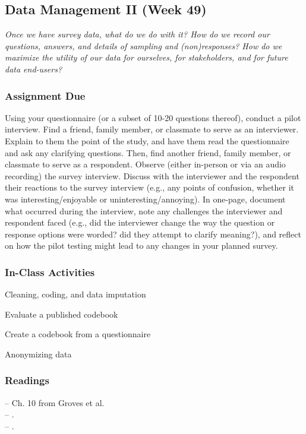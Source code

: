 \documentclass[11pt,a4paper]{article}
\newcommand{\reading}[2][]{\noindent -- {#1}\bibentry{#2}.\vspace{.25em}\\}
\newcommand{\textbook}[2][]{\noindent -- {#1} from Groves et al.\vspace{.25em}\\} %
\newcommand{\seealso}{\noindent \emph{See Also:}\\}
\begin{document}
\clearpage
\subsection{Data Management II (Week 49)}
\emph{Once we have survey data, what do we do with it? How do we record our questions, answers, and details of sampling and (non)responses? How do we maximize the utility of our data for ourselves, for stakeholders, and for future data end-users?}

\vspace{1em}
\subsubsection*{Assignment Due}
Using your questionnaire (or a subset of 10-20 questions thereof), conduct a pilot interview. Find a friend, family member, or classmate to serve as an interviewer. Explain to them the point of the study, and have them read the questionnaire and ask any clarifying questions. Then, find another friend, family member, or classmate to serve as a respondent. Observe (either in-person or via an audio recording) the survey interview. Discuss with the interviewer and the respondent their reactions to the survey interview (e.g., any points of confusion, whether it was interesting/enjoyable or uninteresting/annoying). In one-page, document what occurred during the interview, note any challenges the interviewer and respondent faced (e.g., did the interviewer change the way the question or response options were worded? did they attempt to clarify meaning?), and reflect on how the pilot testing might lead to any changes in your planned survey.

\subsubsection*{In-Class Activities}
\begin{itemize*}
\item Cleaning, coding, and data imputation
\item Evaluate a published codebook
\item Create a codebook from a questionnaire
\item Anonymizing data
\end{itemize*}

\subsubsection*{Readings}
\textbook[Ch. 10]{}
\reading{Simitis1994} %
\reading{DeBell2013} %
\end{document}
